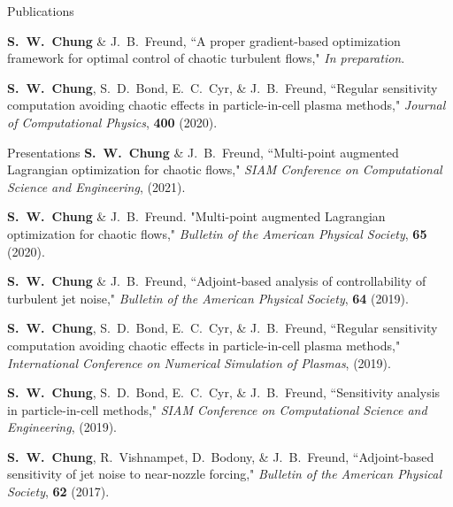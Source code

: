 \documentclass{resume} %
\begin{document}
\begin{rSection}{Publications}
\par
\textbf{S.\ W.\ Chung} \& J.\ B.\ Freund,
``A proper gradient-based optimization framework for optimal control of chaotic turbulent flows,"
\textit{In preparation}.
\par
\textbf{S.\ W.\ Chung}, S.\ D.\ Bond, E.\ C.\ Cyr, \& J.\ B.\ Freund,
``Regular sensitivity computation avoiding chaotic effects in particle-in-cell plasma methods,"
\textit{Journal of Computational Physics}, \textbf{400} (2020).
\end{rSection}

\begin{rSection}{Presentations}
\textbf{S.\ W.\ Chung} \& J.\ B.\ Freund, ``Multi-point augmented Lagrangian optimization for chaotic flows,"
\textit{SIAM Conference on Computational Science and Engineering}, (2021).

\par
\textbf{S.\ W.\ Chung} \& J.\ B.\ Freund. "Multi-point augmented Lagrangian optimization for chaotic flows,"
\textit{Bulletin of the American Physical Society}, \textbf{65} (2020).

\par
\textbf{S.\ W.\ Chung} \& J.\ B.\ Freund,
``Adjoint­-based analysis of controllability of turbulent jet noise,"
\textit{Bulletin of the American Physical Society}, \textbf{64} (2019).

\par
\textbf{S.\ W.\ Chung}, S.\ D.\ Bond, E.\ C.\ Cyr, \& J.\ B.\ Freund,
``Regular sensitivity computation avoiding chaotic effects in particle-in-cell plasma methods,"
\textit{International Conference on Numerical Simulation of Plasmas}, (2019).

\par
\textbf{S.\ W.\ Chung}, S.\ D.\ Bond, E.\ C.\ Cyr, \& J.\ B.\ Freund, ``Sensitivity analysis in particle-in-cell methods,"
\textit{SIAM Conference on Computational Science and Engineering}, (2019).

\par
\textbf{S.\ W.\ Chung}, R.\ Vishnampet, D.\ Bodony, \& J.\ B.\ Freund, ``Adjoint-based sensitivity of jet noise to near-nozzle forcing,"
\textit{Bulletin of the American Physical Society}, \textbf{62} (2017).
\end{rSection}
\end{document}
